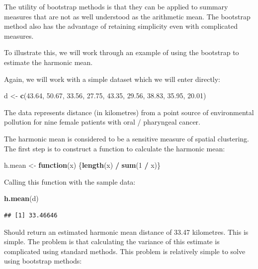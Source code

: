 \documentclass[12pt,a4paper]{book}
\newenvironment{Shaded}{\begin{snugshade}}{\end{snugshade}}
\newcommand{\ControlFlowTok}[1]{\textcolor[rgb]{0.13,0.29,0.53}{\textbf{#1}}}
\newcommand{\DecValTok}[1]{\textcolor[rgb]{0.00,0.00,0.81}{#1}}
\newcommand{\FloatTok}[1]{\textcolor[rgb]{0.00,0.00,0.81}{#1}}
\newcommand{\KeywordTok}[1]{\textcolor[rgb]{0.13,0.29,0.53}{\textbf{#1}}}
\newcommand{\NormalTok}[1]{#1}
\newcommand{\OperatorTok}[1]{\textcolor[rgb]{0.81,0.36,0.00}{\textbf{#1}}}
\newcommand{\StringTok}[1]{\textcolor[rgb]{0.31,0.60,0.02}{#1}}
\theoremstyle{definition}
\theoremstyle{definition}
\theoremstyle{definition}
\theoremstyle{remark}
\begin{document}
The utility of bootstrap methods is that they can be applied to summary
measures that are not as well understood as the arithmetic mean. The
bootstrap method also has the advantage of retaining simplicity even
with complicated measures.

To illustrate this, we will work through an example of using the
bootstrap to estimate the harmonic mean.

Again, we will work with a simple dataset which we will enter directly:

\begin{Shaded}
\begin{Highlighting}[]
\NormalTok{d <-}\StringTok{ }\KeywordTok{c}\NormalTok{(}\FloatTok{43.64}\NormalTok{, }\FloatTok{50.67}\NormalTok{, }\FloatTok{33.56}\NormalTok{, }\FloatTok{27.75}\NormalTok{, }\FloatTok{43.35}\NormalTok{, }\FloatTok{29.56}\NormalTok{, }\FloatTok{38.83}\NormalTok{, }\FloatTok{35.95}\NormalTok{, }\FloatTok{20.01}\NormalTok{)}
\end{Highlighting}
\end{Shaded}

The data represents distance (in kilometres) from a point source of
environmental pollution for nine female patients with oral / pharyngeal
cancer.

The harmonic mean is considered to be a sensitive measure of spatial
clustering. The first step is to construct a function to calculate the
harmonic mean:

\begin{Shaded}
\begin{Highlighting}[]
\NormalTok{h.mean <-}\StringTok{ }\ControlFlowTok{function}\NormalTok{(x) \{}\KeywordTok{length}\NormalTok{(x) }\OperatorTok{/}\StringTok{ }\KeywordTok{sum}\NormalTok{(}\DecValTok{1} \OperatorTok{/}\StringTok{ }\NormalTok{x)\}}
\end{Highlighting}
\end{Shaded}

Calling this function with the sample data:

\begin{Shaded}
\begin{Highlighting}[]
\KeywordTok{h.mean}\NormalTok{(d)}
\end{Highlighting}
\end{Shaded}

\begin{verbatim}
## [1] 33.46646
\end{verbatim}

Should return an estimated harmonic mean distance of 33.47 kilometres.
This is simple. The problem is that calculating the variance of this
estimate is complicated using standard methods. This problem is
relatively simple to solve using bootstrap methods:
\end{document}
